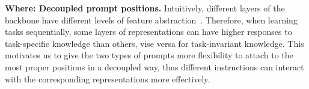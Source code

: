 \documentclass[runningheads]{llncs}
\newcommand{\zifeng}[1]{\textcolor{red}{Zifeng: #1}}
\newcommand{\zizhaoz}[1]{\textcolor{green}{Zizhao: #1}}
\newcommand{\gprompt}{G-Prompt\xspace}
\newcommand{\eprompt}{E-Prompt\xspace}
\newcommand{\combiner}{PAF\xspace}
\def\pfunc{{f_{\text{prompt}}}}
\def \iep{\texttt{start}_{\ve}}
\def \jep{\texttt{end}_{\ve}}
\def \igp{\texttt{start}_{\vg}}
\def \jgp{\texttt{end}_{\vg}}
\begin{document}




\textbf{Where: Decoupled prompt positions.} %
Intuitively, different layers of the backbone have different levels of feature abstraction~\cite{raghu2021vision}. Therefore, when learning tasks sequentially, some layers of representations can have higher responses to task-specific knowledge than others, vise versa for task-invariant knowledge. This motivates us to give the two types of prompts more flexibility to attach to the most proper positions in a decoupled way, thus different instructions can interact with the corresponding representations more effectively. %
\end{document}
